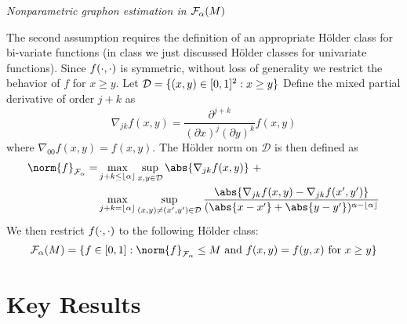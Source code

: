 \documentclass[11pt]{article}
\begin{document}
\begin{assump}\label{assump:holder}
\textit{Nonparametric graphon estimation in $\mathcal{F}_{\alpha}(M)$}

\noindent
The second assumption requires the definition of an appropriate H\"older class for bi-variate functions (in class we just discussed H\"older classes for univariate functions). Since $f(\cdot, \cdot)$ is symmetric, without loss of generality we restrict the behavior of $f$ for $x \geq y$. Let $\mathcal{D} = \{(x, y) \in [0, 1]^2 : x \geq y\}$ Define the mixed partial derivative of order $j + k$ as
\begin{equation}
\nabla_{jk} f(x, y) = \frac{\partial^{j+k}}{(\partial x)^j (\partial y)^k}f(x, y)
\end{equation}
where $\nabla_{00} f(x, y) = f(x, y)$. The H\"older norm on $\mathcal{D}$ is then defined as
\begin{equation}
\begin{aligned}
\norm{f}_{\mathcal{F}_{\alpha}} = &\max_{j + k \leq \floor{\alpha}} \sup_{x,y \in \mathcal{D}} \abs{\nabla_{jk}f(x, y)} \ + \\
& \max_{j + k = \floor{\alpha}} \sup_{(x, y) \neq (x', y') \in \mathcal{D}}
\frac{\abs{\nabla_{jk}f(x,y) - \nabla_{jk}f(x', y')}}{(\abs{x - x'} + \abs{y -y'})^{\alpha - \floor{\alpha}}}
\end{aligned}
\end{equation}
We then restrict $f(\cdot, \cdot)$ to the following H\"older class:
\begin{equation}
\holder = \set{f \in [0, 1] : \norm{f}_{\mathcal{F}_{\alpha}} \leq M \text{ and } f(x, y) = f(y, x) \text{ for } x \geq y}
\end{equation}
\end{assump}

\section{Key Results} \label{sec:key_results}



\end{document}
